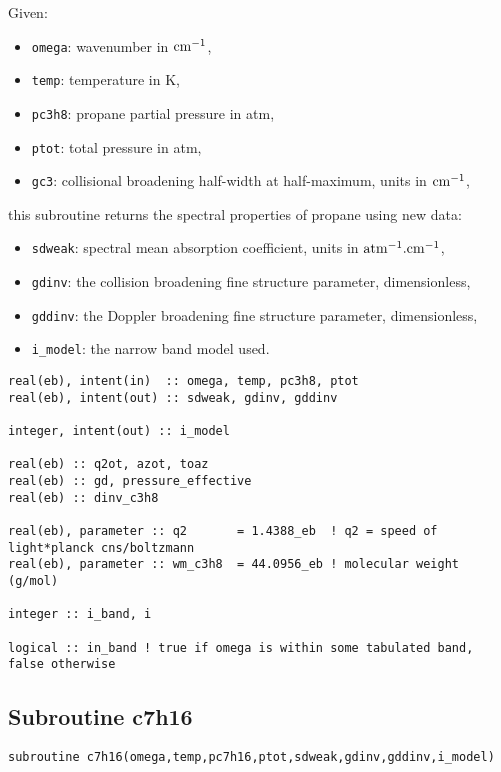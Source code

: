 Given:
\begin{itemize}
 \item \verb=omega=: wavenumber in $\rm cm^{-1}$,
 \item \verb=temp=: temperature in K,
 \item \verb=pc3h8=: propane partial pressure in atm,
 \item \verb=ptot=: total pressure in atm,
 \item \verb=gc3=: collisional broadening half-width at half-maximum, units in $\rm cm^{-1}$,
\end{itemize}
this subroutine returns the spectral properties of propane using new data:
\begin{itemize}
 \item \verb=sdweak=: spectral mean absorption coefficient, units in $\rm atm^{-1}.cm^{-1}$,
 \item \verb=gdinv=: the collision broadening fine structure parameter, dimensionless,
 \item \verb=gddinv=: the Doppler broadening fine structure parameter, dimensionless,
 \item \verb=i_model=: the narrow band model used.
\end{itemize}

\begin{lstlisting}
real(eb), intent(in)  :: omega, temp, pc3h8, ptot
real(eb), intent(out) :: sdweak, gdinv, gddinv

integer, intent(out) :: i_model

real(eb) :: q2ot, azot, toaz
real(eb) :: gd, pressure_effective
real(eb) :: dinv_c3h8

real(eb), parameter :: q2       = 1.4388_eb  ! q2 = speed of light*planck cns/boltzmann
real(eb), parameter :: wm_c3h8  = 44.0956_eb ! molecular weight (g/mol)

integer :: i_band, i

logical :: in_band ! true if omega is within some tabulated band, false otherwise
\end{lstlisting}


\subsection{Subroutine c7h16}
\label{sub:c7h16}

\begin{lstlisting}
subroutine c7h16(omega,temp,pc7h16,ptot,sdweak,gdinv,gddinv,i_model)
\end{lstlisting}

